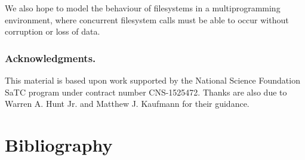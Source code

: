 \documentclass[submission,copyright,creativecommons]{eptcs}
\begin{document}
We also hope to model the behaviour of filesystems in a
multiprogramming environment, where concurrent filesystem calls must
be able to occur without corruption or loss of data.

\subsubsection*{Acknowledgments.} This material is based upon work
supported by the National Science Foundation SaTC program under
contract number CNS-1525472. Thanks are also due to Warren A. Hunt
Jr. and Matthew J. Kaufmann for their guidance.

\section{Bibliography}



\end{document}
